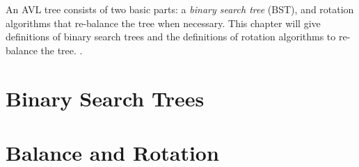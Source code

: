 An AVL tree consists of two basic parts: a \textit{binary search tree} (BST), and rotation algorithms that re-balance the tree when necessary.
This chapter will give definitions of binary search trees and the definitions of rotation algorithms to re-balance the tree. .

\section{Binary Search Trees}


\section{Balance and Rotation}
